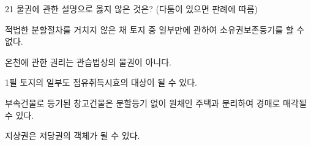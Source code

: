 \begin{question}{21}
물권에 관한 설명으로 옳지 않은 것은? (다툼이 있으면 판례에 따름)
\begin{choices}
  \item 적법한 분할절차를 거치지 않은 채 토지 중 일부만에 관하여 소유권보존등기를 할 수 없다.
  \item 온천에 관한 권리는 관습법상의 물권이 아니다.
  \item 1필 토지의 일부도 점유취득시효의 대상이 될 수 있다.
  \item 부속건물로 등기된 창고건물은 분할등기 없이 원채인 주택과 분리하여 경매로 매각될 수 있다.
  \item 지상권은 저당권의 객체가 될 수 있다.
\end{choices}
\end{question}
